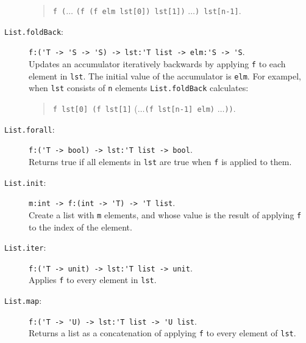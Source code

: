 \documentclass[fsharpNotes.tex]{subfiles}
\begin{document}
\begin{description}
\begin{quote}
    \lstinline{f (}$\ldots$ \lstinline{(f (f elm lst[0]) lst[1])} $\ldots$\lstinline{) lst[n-1]}.
  \end{quote}
\item[\texttt{List.foldBack}:] \lstinline{f:('T -> 'S -> 'S) -> lst:'T list -> elm:'S -> 'S}.~\\
  Updates an accumulator iteratively backwards by applying \lstinline{f} to each element in \lstinline{lst}. The initial value of the accumulator is \lstinline{elm}. For exampel, when \lstinline{lst} consists of \lstinline{n} elements
  \lstinline{List.foldBack} calculates:
  \begin{quote}
    \lstinline{f lst[0] (f lst[1]} ($\ldots$\lstinline{(f lst[n-1] elm)} $\ldots$\lstinline{))}.
  \end{quote}
\item[\texttt{List.forall}:] \lstinline{f:('T -> bool) -> lst:'T list -> bool}.~\\
  Returns true if all elements in \lstinline{lst} are true when \lstinline{f} is applied to them.
\item[\texttt{List.init}:] \lstinline{m:int -> f:(int -> 'T) -> 'T list}.~\\
  Create a list with \lstinline{m} elements, and whose value is the result of applying \lstinline{f} to the index of the element.
\item[\texttt{List.iter}:] \lstinline{f:('T -> unit) -> lst:'T list -> unit}.~\\
  Applies \lstinline{f} to every element in \lstinline{lst}.
\item[\texttt{List.map}:] \lstinline{f:('T -> 'U) -> lst:'T list -> 'U list}.~\\
  Returns a list as a concatenation of applying \lstinline{f} to every element of \lstinline{lst}.
\end{description}
\end{document}

